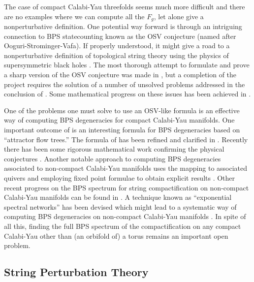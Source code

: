 \documentclass[12pt]{article}
\begin{document}
The case of compact Calabi-Yau threefolds seems much more difficult and
there are no examples where we can compute all the $F_g$, let alone give a
nonperturbative definition. One potential way forward is through an  
intriguing connection to BPS statecounting known as the OSV conjecture (named after Ooguri-Strominger-Vafa). 
If properly understood, it might give a road to a nonperturbative definition of 
topological string theory using the physics of supersymmetric black holes \cite{Ooguri:2004zv}.
The most thorough attempt to formulate and prove a sharp version of the OSV
conjecture was made in \cite{Denef:2007vg}, but a completion of the project
requires the solution of a number of unsolved problems addressed in the conclusion of \cite{Denef:2007vg}. 
Some mathematical progress on these issues has been achieved in 
\cite{Toda-BologmolovGieseker,Feyzbakhsh:2022ydn}.

One of the problems one must solve to use an OSV-like formula is an 
effective way of computing BPS degeneracies for compact Calabi-Yau manifolds. One important outcome of
\cite{Denef:2000nb,Denef:2001xn,Denef:2002ru, Denef:2007vg} 
is an interesting formula for BPS degeneracies based on ``attractor flow trees.'' The formula of \cite{Denef:2000nb,Denef:2001xn,Denef:2002ru, Denef:2007vg}   has been refined and 
clarified in \cite{Manschot:2010xp,Andriyash:2010yf,Alexandrov:2018iao}. 
Recently there has been some rigorous mathematical work confirming the 
physical conjectures \cite{Arguz:2021zpx,Mozgovoy:2021iwz}. Another notable approach to computing 
BPS degeneracies associated to non-compact Calabi-Yau manifolds uses the mapping 
to associated quivers and employing fixed point formulae to obtain explicit results
\cite{Manschot:2010qz,Manschot:2011xc,Manschot:2012rx,
Manschot:2013sya,Manschot:2014fua}. Other recent progress on the BPS spectrum for string compactification on non-compact Calabi-Yau manifolds can be found in \cite{Mozgovoy:2020has,Descombes:2021snc,Alexandrov:2022pgd}.
A technique known as ``exponential spectral networks'' has been devised which might lead to a systematic way of computing  BPS degeneracies on non-compact Calabi-Yau manifolds \cite{Eager:2016yxd,Banerjee:2018syt,Banerjee:2019apt,Banerjee:2020moh}. 
In spite of all this, finding the full BPS spectrum of 
the compactification on any compact Calabi-Yau other than (an orbifold of) a torus remains an important 
open problem. 


\subsection{String Perturbation Theory}
\end{document}
